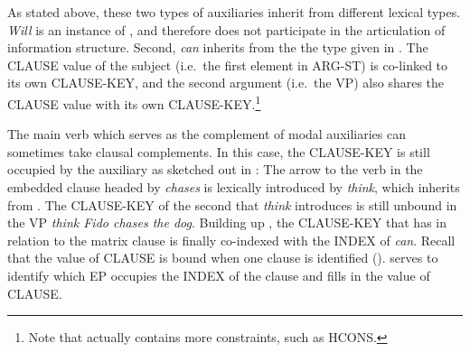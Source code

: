 \noindent As stated above, these two types of auxiliaries inherit from
different lexical types. \textit{Will} is an instance of
, and therefore does not participate in the
articulation of information structure. Second, \textit{can} inherits
from the the type given in
. The CLAUSE value of
the subject (i.e.\ the first element in ARG-ST) is co-linked to its
own CLAUSE-KEY, and the second argument
(i.e.\ the VP) also shares the CLAUSE value with its own
CLAUSE-KEY.\footnote{Note that
   actually contains
  more constraints, such as HCONS.}





The main verb which serves as the complement of modal auxiliaries can
sometimes take clausal complements. In
this case, the CLAUSE-KEY is still occupied by the auxiliary as
sketched out in : The
arrow to the verb in the embedded clause headed by \textit{chases} is
lexically introduced by \textit{think}, which inherits from
. The CLAUSE-KEY of the second 
that \textit{think} introduces is still unbound in the VP
\textit{think Fido chases the dog}. Building up
, the CLAUSE-KEY that  has in
relation to the matrix clause is finally co-indexed with the INDEX of
\textit{can}. Recall that the value of CLAUSE is bound when one clause
is identified ().  serves to
identify which EP occupies the INDEX of the clause and fills in the
value of CLAUSE.









